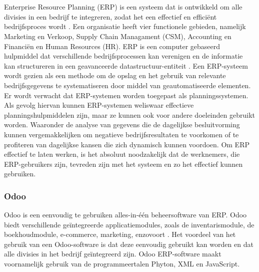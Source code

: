 \chapter{}%
\label{ch:stand-van-zaken}



\section{}%
\label{sec:erp}
Enterprise Resource Planning (ERP) is een systeem dat is ontwikkeld om alle divisies in een bedrijf te integreren, zodat het een effectief en efficiënt bedrijfsproces wordt \autocite{Wardhanaa2022}. Een organisatie heeft vier functionele gebieden, namelijk Marketing en Verkoop, Supply Chain Managament (CSM), Accounting en Financiën en Human Resources (HR).
ERP is een computer gebaseerd hulpmiddel dat verschillende bedrijfsprocessen kan verenigen en de informatie kan structureren in een geavanceerde datastructuur-entiteit \autocite{Xulu2020}. Een ERP-systeem wordt gezien als een methode om de opslag en het gebruik van relevante bedrijfsgegevens te systematiseren door middel van geautomatiseerde elementen. Er wordt verwacht dat ERP-systemen worden toegepast als planningssystemen. Als gevolg hiervan kunnen ERP-systemen weliswaar effectieve planningshulpmiddelen zijn, maar ze kunnen ook voor andere doeleinden gebruikt worden. Waaronder de analyse van gegevens die de dagelijkse besluitvorming kunnen vergemakkelijken om negatieve bedrijfsresultaten te voorkomen of te profiteren van dagelijkse kansen die zich dynamisch kunnen voordoen.
Om ERP effectief te laten werken, is het absoluut noodzakelijk dat de werknemers, die ERP-gebruikers zijn, tevreden zijn met het systeem en zo het effectief kunnen gebruiken.

\subsection{Odoo}
Odoo is een eenvoudig te gebruiken alles-in-één beheersoftware van ERP. Odoo biedt verschillende geïntegreerde applicatiemodules, zoals de inventarismodule, de boekhoudmodule, e-commerce, marketing, enzovoort \autocite{Wardhanaa2022}. Het voordeel van het gebruik van een Odoo-software is dat deze eenvoudig gebruikt kan worden en dat alle divisies in het bedrijf geïntegreerd zijn. Odoo ERP-software maakt voornamelijk gebruik van de programmeertalen Phyton, XML en JavaScript.

